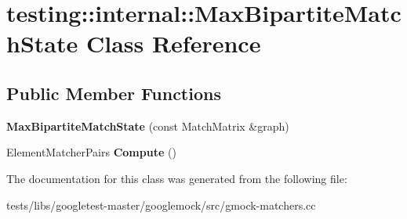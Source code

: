 \hypertarget{classtesting_1_1internal_1_1MaxBipartiteMatchState}{}\section{testing\+:\+:internal\+:\+:Max\+Bipartite\+Match\+State Class Reference}
\label{classtesting_1_1internal_1_1MaxBipartiteMatchState}
\subsection*{Public Member Functions}
\begin{DoxyCompactItemize}
\item 
\mbox{\label{classtesting_1_1internal_1_1MaxBipartiteMatchState_a9d0166d5cc7afd1b741f6c312df72b54}} 
{\bfseries Max\+Bipartite\+Match\+State} (const Match\+Matrix \&graph)
\item 
\mbox{\label{classtesting_1_1internal_1_1MaxBipartiteMatchState_af6efab664ee390925b24d023f1368192}} 
Element\+Matcher\+Pairs {\bfseries Compute} ()
\end{DoxyCompactItemize}


The documentation for this class was generated from the following file\+:\begin{DoxyCompactItemize}
\item 
tests/libs/googletest-\/master/googlemock/src/gmock-\/matchers.\+cc\end{DoxyCompactItemize}
